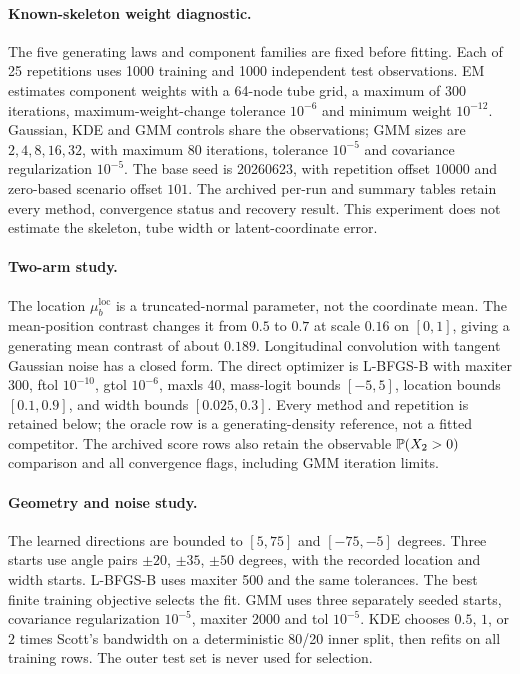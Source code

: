 \paragraph{Known-skeleton weight diagnostic.}
The five generating laws and component families are fixed before fitting.
Each of 25 repetitions uses 1000 training and 1000 independent test
observations. EM estimates component weights with a 64-node tube grid,
a maximum of 300 iterations, maximum-weight-change tolerance $10^{-6}$
and minimum weight $10^{-12}$. Gaussian, KDE and GMM controls share the
observations; GMM sizes are $2,4,8,16,32$, with maximum 80 iterations,
tolerance $10^{-5}$ and covariance regularization $10^{-5}$.
The base seed is 20260623, with repetition offset $10000$ and
zero-based scenario offset $101$. The archived per-run and summary tables
retain every method, convergence status and recovery result. This experiment
does not estimate the skeleton, tube width or latent-coordinate error.

\paragraph{Two-arm study.}
The location $\mu_b^{\mathrm{loc}}$ is a truncated-normal parameter, not the
coordinate mean. The mean-position contrast changes it from $0.5$ to $0.7$
at scale $0.16$ on $[0,1]$, giving a generating mean contrast of about $0.189$.
Longitudinal convolution with tangent Gaussian noise has a closed form.
The direct optimizer is L-BFGS-B with maxiter 300, ftol $10^{-10}$, gtol
$10^{-6}$, maxls 40, mass-logit bounds $[-5,5]$, location bounds $[0.1,0.9]$,
and width bounds $[0.025,0.3]$. Every method and repetition is retained below;
the oracle row is a generating-density reference, not a fitted competitor.
The archived score rows also retain the observable $\mathbb P(X_2>0)$ comparison
and all convergence flags, including GMM iteration limits.

\paragraph{Geometry and noise study.}
The learned directions are bounded to $[5,75]$ and $[-75,-5]$ degrees. Three
starts use angle pairs $\pm20$, $\pm35$, $\pm50$ degrees, with the recorded
location and width starts. L-BFGS-B uses maxiter 500 and the same tolerances.
The best finite training objective selects the fit. GMM uses three separately
seeded starts, covariance regularization $10^{-5}$, maxiter 2000 and tol
$10^{-5}$. KDE chooses $0.5$, $1$, or $2$ times Scott's bandwidth on a
deterministic 80/20 inner split, then refits on all training rows. The outer
test set is never used for selection.

